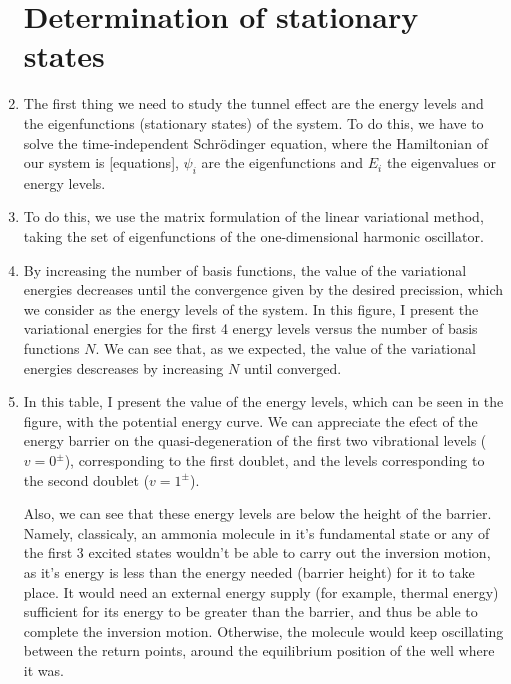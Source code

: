 \documentclass[12pt, a4paper]{article}
\begin{document}
\begin{enumerate}[label=\textbf{Slide \arabic*.}]
    \section{Determination of stationary states}

    \item The first thing we need to study the tunnel effect are the energy levels and the eigenfunctions (stationary states) of the system. To do this, we have to solve the time-independent Schrödinger equation, where the Hamiltonian of our system is [equations], $\psi_i$ are the eigenfunctions and $E_i$ the eigenvalues or energy levels.

    \item To do this, we use the matrix formulation of the linear variational method, taking the set of eigenfunctions of the one-dimensional harmonic oscillator.

    \item By increasing the number of basis functions, the value of the variational energies decreases until the convergence given by the desired precission, which we consider as the energy levels of the system. In this figure, I present the variational energies for the first 4 energy levels versus the number of basis functions $N$. We can see that, as we expected, the value of the variational energies descreases by increasing $N$ until converged.

    \item In this table, I present the value of the energy levels, which can be seen in the figure, with the potential energy curve. We can appreciate the efect of the energy barrier on the quasi-degeneration of the first two vibrational levels ($v=0^{\pm}$), corresponding to the first doublet, and the levels corresponding to the second doublet ($v=1^{\pm}$).

        Also, we can see that these energy levels are below the height of the barrier. Namely, classicaly, an ammonia molecule in it's fundamental state or any of the first 3 excited states wouldn't be able to carry out the inversion motion, as it's energy is less than the energy needed (barrier height) for it to take place. It would need an external energy supply (for example, thermal energy) sufficient for its energy to be greater than the barrier, and thus be able to complete the inversion motion. Otherwise, the molecule would keep oscillating between the return points, around the equilibrium position of the well where it was.


\end{enumerate}
\end{document}
